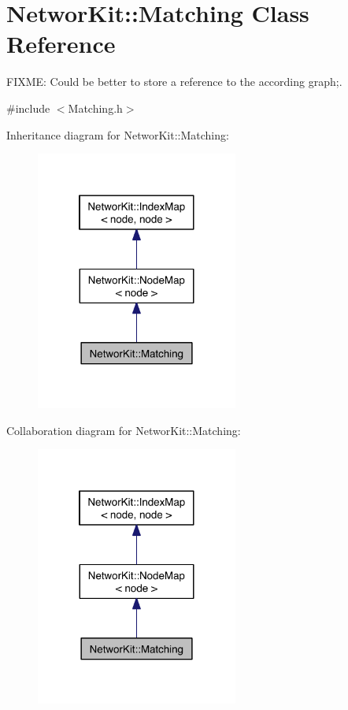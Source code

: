 \hypertarget{class_networ_kit_1_1_matching}{\section{Networ\-Kit\-:\-:Matching Class Reference}
\label{class_networ_kit_1_1_matching}
}


F\-I\-X\-M\-E\-: Could be better to store a reference to the according graph;.  




{\ttfamily \#include $<$Matching.\-h$>$}



Inheritance diagram for Networ\-Kit\-:\-:Matching\-:\nopagebreak
\begin{figure}[H]
\begin{center}
\leavevmode
\includegraphics[width=188pt]{class_networ_kit_1_1_matching__inherit__graph}
\end{center}
\end{figure}


Collaboration diagram for Networ\-Kit\-:\-:Matching\-:\nopagebreak
\begin{figure}[H]
\begin{center}
\leavevmode
\includegraphics[width=188pt]{class_networ_kit_1_1_matching__coll__graph}
\end{center}
\end{figure}
